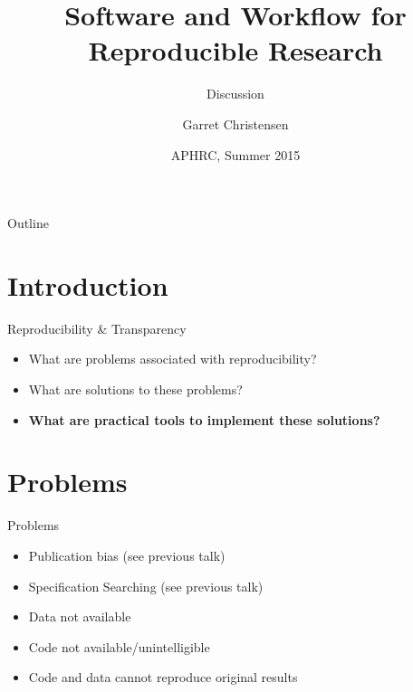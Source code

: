 \documentclass{beamer}
\title[Software and Workflow] %
{Software and Workflow for Reproducible Research}
\subtitle
{Discussion} %
\author[Christensen] %
{Garret Christensen\inst{1}}
\institute[UC Berkeley, Berkely Initiatiative for Transparency in the Social Sciences] %
{
  \inst{1}%
  UC Berkeley: Berkely Initiatiative for Transparency in the Social Sciences\\
  Berkeley Institute for Data Science
}
\date[Short Occasion] %
{APHRC, Summer 2015}
\begin{document}


\begin{frame}
  \titlepage
\end{frame}

\begin{frame}{Outline}
  \tableofcontents
\end{frame}

\section{Introduction}

\begin{frame}{Reproducibility \& Transparency}
\begin{itemize}
\item What are problems associated with reproducibility?
\item What are solutions to these problems?
\item \textbf{What are practical tools to implement these solutions?}
\end{itemize}
\end{frame}
\section{Problems}
\begin{frame}{Problems}
 \begin{itemize}
 \item Publication bias (see previous talk)
 \item Specification Searching (see previous talk)
 \item Data not available
 \item Code not available/unintelligible
 \item Code and data cannot reproduce original results
 \end{itemize}
\end{frame}
\end{document}
